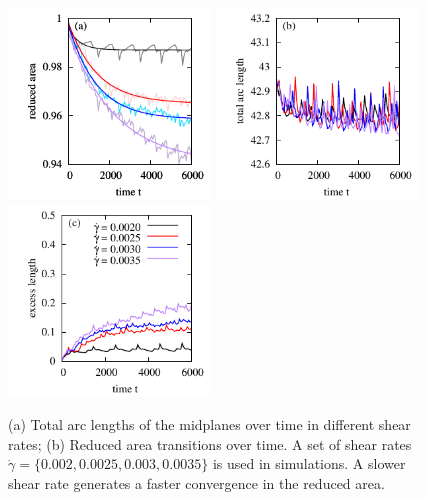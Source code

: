 \documentclass[lineno]{jfm}
\begin{document}
\begin{figure}
\begin{center}
\hspace{-1cm}
\includegraphics[height=2in]{ReducedArea.pdf}
\hspace{-1cm}
\includegraphics[height=2in]{ArcLength.pdf}
\hspace{-1cm}
\includegraphics[height=2in]{ExcLength.pdf}
\end{center} 
  \caption{(a) Total arc lengths of the midplanes over time in different shear rates; (b) Reduced area transitions over time. 
A set of shear rates $\dot\gamma=\{0.002,0.0025,0.003,0.0035\}$ is used in simulations. 
A slower shear rate generates a faster convergence in the reduced area. 
  }
    \label{figure4}
\end{figure}
\end{document}
